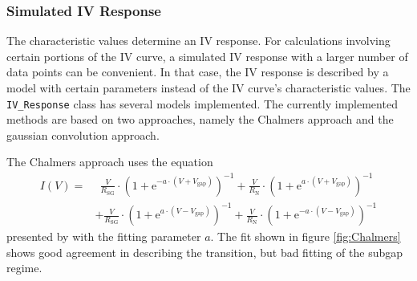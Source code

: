 \documentclass[]{article}
\begin{document}
\subsubsection{Simulated IV Response}
The characteristic values determine an IV response. For calculations involving certain portions of the IV curve, a simulated IV response with a larger number of data points can be convenient. In that case, the IV response is described by a model with certain parameters instead of the IV curve's characteristic values. The \texttt{IV\_Response} class has several models implemented. The currently implemented methods are based on two approaches, namely the Chalmers approach and the gaussian convolution approach.

The Chalmers approach uses the equation 
\begin{equation}
\begin{split}
	I(V) = &~~ \frac{V}{R_\text{SG}}\cdot\left(1+\text{e}^{-a\cdot(V+V_\text{gap})}\right)^{-1}
	+\frac{V}{R_\text{N}}\cdot\left(1+\text{e}^{a\cdot(V+V_\text{gap})}\right)^{-1}
	\\&+\frac{V}{R_\text{SG}}\cdot\left(1+\text{e}^{a\cdot(V-V_\text{gap})}\right)^{-1}
	+\frac{V}{R_\text{N}}\cdot\left(1+\text{e}^{-a\cdot(V-V_\text{gap})}\right)^{-1}
\end{split}
\end{equation}
presented by \cite{Rashid2016} with the fitting parameter $a$. The fit shown in figure \ref{fig:Chalmers} shows good agreement in describing the transition, but bad fitting of the subgap regime.
\end{document}
